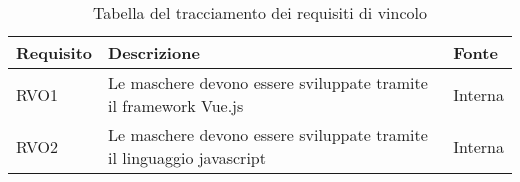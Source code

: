 \begin{table}[H]
\caption{Tabella del tracciamento dei requisiti di vincolo}
\label{tab:requisiti-vincolo}
\renewcommand{\arraystretch}{1.6}
\begin{tabularx}{\textwidth}{lXl}
\hline\hline
\textbf{Requisito} & \textbf{Descrizione} & \textbf{Fonte}\\
\hline
RVO1 & Le maschere devono essere sviluppate tramite il framework Vue.js & Interna \\
\hline
RVO2 & Le maschere devono essere sviluppate tramite il linguaggio javascript & Interna \\
\hline
\end{tabularx}
\end{table}%